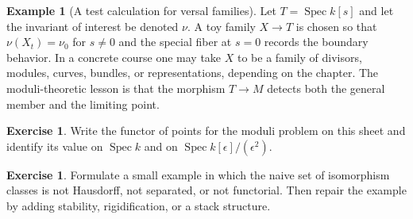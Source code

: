 \documentclass[11pt]{amsart}
\theoremstyle{definition}
\newtheorem{example}[theorem]{Example}
\newtheorem{exercise}[theorem]{Exercise}
\newcommand{\Spec}{\operatorname{Spec}}
\begin{document}
\begin{example}[A test calculation for versal families]
Let $T=\Spec k[s]$ and let the invariant of interest be denoted $\nu$.  A toy family $X\to T$ is chosen so that $\nu(X_t)=\nu_0$ for $s\ne0$ and the special fiber at $s=0$ records the boundary behavior.  In a concrete course one may take $X$ to be a family of divisors, modules, curves, bundles, or representations, depending on the chapter.  The moduli-theoretic lesson is that the morphism $T\to M$ detects both the general member and the limiting point.
\end{example}
\begin{exercise}
Write the functor of points for the moduli problem on this sheet and identify its value on $\Spec k$ and on $\Spec k[\epsilon]/(\epsilon^2)$.
\end{exercise}
\begin{exercise}
Formulate a small example in which the naive set of isomorphism classes is not Hausdorff, not separated, or not functorial.  Then repair the example by adding stability, rigidification, or a stack structure.
\end{exercise}
\clearpage
\end{document}
